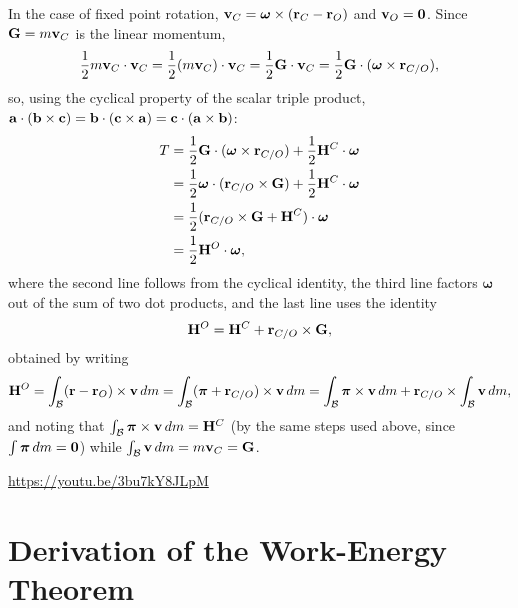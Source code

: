 \documentclass[
  letterpaper,
  DIV=11,
  numbers=noendperiod]{scrreprt}
\newcommand{\bomega}{\boldsymbol{\omega}}
\newcommand{\bpi}{\boldsymbol{\pi}}
\begin{document}
In the case of fixed point rotation,
\({\bf v}_C = \bomega\times({\bf r}_C-{\bf r}_O)\) and
\({\bf v}_O = {\bf 0}\). Since \({\bf G}=m{\bf v}_C\) is the linear
momentum, \begin{align}
    \frac{1}{2}m{\bf v}_C\cdot{\bf v}_C = \frac{1}{2}(m{\bf v}_C)\cdot{\bf v}_C = \frac{1}{2}{\bf G}\cdot{\bf v}_C = \frac{1}{2}{\bf G}\cdot(\bomega\times{\bf r}_{C/O}),
\end{align} so, using the cyclical property of the scalar triple
product,
\({\bf a}\cdot({\bf b}\times{\bf c}) = {\bf b}\cdot({\bf c}\times{\bf a}) = {\bf c}\cdot({\bf a}\times{\bf b})\):
\begin{align}
    \begin{split}
        T &= \frac{1}{2}{\bf G}\cdot(\bomega\times{\bf r}_{C/O})+\frac{1}{2}{\bf H}^C\cdot\bomega\\
        &= \frac{1}{2}\bomega\cdot({\bf r}_{C/O}\times{\bf G})+\frac{1}{2}{\bf H}^C\cdot\bomega\\
        &= \frac{1}{2}({\bf r}_{C/O}\times{\bf G}+{\bf H}^C)\cdot\bomega\\
        &= \frac{1}{2}{\bf H}^O\cdot\bomega,
    \end{split}
\end{align} where the second line follows from the cyclical identity,
the third line factors \(\bomega\) out of the sum of two dot products,
and the last line uses the identity \begin{align}
    {\bf H}^O = {\bf H}^C+{\bf r}_{C/O}\times{\bf G},
\end{align} obtained by writing \begin{align}
    {\bf H}^O=\int_{\mathcal{B}}({\bf r}-{\bf r}_O)\times{\bf v}\,dm=\int_{\mathcal{B}}(\bpi+{\bf r}_{C/O})\times{\bf v}\,dm=\int_{\mathcal{B}}\bpi\times{\bf v}\,dm+{\bf r}_{C/O}\times\int_{\mathcal{B}}{\bf v}\,dm,
\end{align} and noting that
\(\int_{\mathcal{B}}\bpi\times{\bf v}\,dm={\bf H}^C\) (by the same steps
used above, since \(\int\bpi\,dm={\bf 0}\)) while
\(\int_{\mathcal{B}}{\bf v}\,dm=m{\bf v}_C={\bf G}\).

\url{https://youtu.be/3bu7kY8JLpM}

\section{Derivation of the Work-Energy
Theorem}\label{derivation-of-the-work-energy-theorem}
\end{document}
